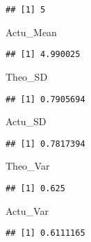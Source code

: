 \documentclass[
]{article}
\newenvironment{Shaded}{\begin{snugshade}}{\end{snugshade}}
\newcommand{\NormalTok}[1]{#1}
\begin{document}
\begin{verbatim}
## [1] 5
\end{verbatim}

\begin{Shaded}
\begin{Highlighting}[]
\NormalTok{Actu_Mean}
\end{Highlighting}
\end{Shaded}

\begin{verbatim}
## [1] 4.990025
\end{verbatim}

\begin{Shaded}
\begin{Highlighting}[]
\NormalTok{Theo_SD}
\end{Highlighting}
\end{Shaded}

\begin{verbatim}
## [1] 0.7905694
\end{verbatim}

\begin{Shaded}
\begin{Highlighting}[]
\NormalTok{Actu_SD}
\end{Highlighting}
\end{Shaded}

\begin{verbatim}
## [1] 0.7817394
\end{verbatim}

\begin{Shaded}
\begin{Highlighting}[]
\NormalTok{Theo_Var}
\end{Highlighting}
\end{Shaded}

\begin{verbatim}
## [1] 0.625
\end{verbatim}

\begin{Shaded}
\begin{Highlighting}[]
\NormalTok{Actu_Var}
\end{Highlighting}
\end{Shaded}

\begin{verbatim}
## [1] 0.6111165
\end{verbatim}
\end{document}
